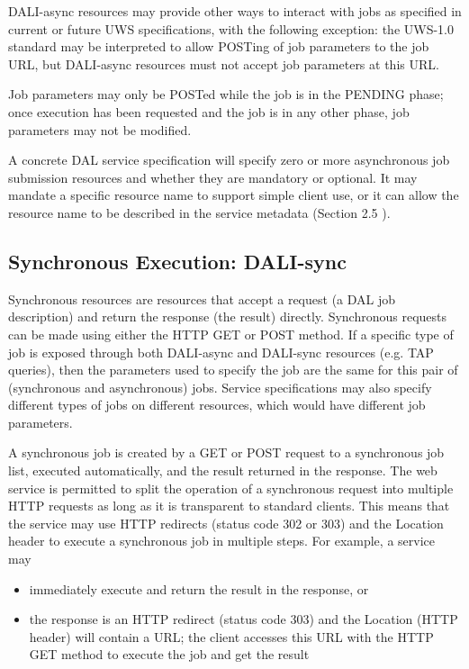 \documentclass[11pt,letter]{ivoa}
\begin{document}
DALI-async resources may provide other ways to interact with jobs as specified 
in current or future UWS specifications, with the following exception: the 
UWS-1.0 standard may be interpreted to allow POSTing of job parameters to the 
job URL, but DALI-async resources must not accept job parameters at this URL.

Job parameters may only be POSTed while the job is in the PENDING phase; once 
execution has been requested and the job is in any other phase, job parameters 
may not be modified.

A concrete DAL service specification will specify zero or more asynchronous job 
submission resources and whether they are mandatory or optional. It may mandate 
a specific resource name to support simple client use, or it can allow the 
resource name to be described in the service metadata (Section 2.5 ).

\subsection{Synchronous Execution: DALI-sync}
\label{sec:dali-sync}
Synchronous resources are resources that accept a request (a DAL job 
description) and return the response (the result) directly. Synchronous requests 
can be made using either the HTTP GET or POST method. If a specific type of job 
is exposed through both DALI-async and DALI-sync resources (e.g. TAP queries), 
then the parameters used to specify the job are the same for  this pair of 
(synchronous and asynchronous) jobs. Service specifications may also specify 
different types of jobs on different resources, which would have different job 
parameters.

A synchronous job is created by a GET or POST request to a synchronous job list, 
executed automatically, and the result returned in the response. The web service 
is permitted to split the operation of a synchronous request into multiple HTTP 
requests as long as it is transparent to standard clients. This means that the 
service may use HTTP redirects (status code 302 or 303) and the Location header 
to execute a synchronous job in multiple steps. For example, a service may

\begin{itemize}
\item immediately execute and return the result in the response, or 
\item the response is an HTTP redirect (status code 303) and the Location (HTTP 
header) will contain a URL; the client accesses this URL with the HTTP GET 
method to execute the job and get the result 
\end{itemize}
\end{document}
